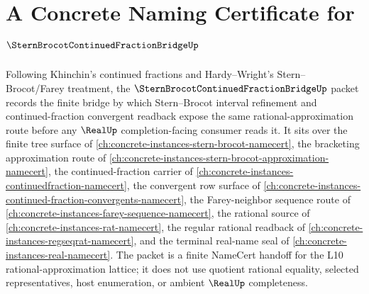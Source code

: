 \chapter{A Concrete Naming Certificate for $\SternBrocotContinuedFractionBridgeUp$}
\label{ch:concrete-instances-stern-brocot-continued-fraction-bridge-namecert}

Following Khinchin's continued fractions and Hardy--Wright's Stern--Brocot/Farey treatment, the $\SternBrocotContinuedFractionBridgeUp$ packet records the finite bridge by which Stern--Brocot interval refinement and continued-fraction convergent readback expose the same rational-approximation route before any $\RealUp$ completion-facing consumer reads it. It sits over the finite tree surface of \autoref{ch:concrete-instances-stern-brocot-namecert}, the bracketing approximation route of \autoref{ch:concrete-instances-stern-brocot-approximation-namecert}, the continued-fraction carrier of \autoref{ch:concrete-instances-continuedfraction-namecert}, the convergent row surface of \autoref{ch:concrete-instances-continued-fraction-convergents-namecert}, the Farey-neighbor sequence route of \autoref{ch:concrete-instances-farey-sequence-namecert}, the rational source of \autoref{ch:concrete-instances-rat-namecert}, the regular rational readback of \autoref{ch:concrete-instances-regseqrat-namecert}, and the terminal real-name seal of \autoref{ch:concrete-instances-real-namecert}. The packet is a finite NameCert handoff for the L10 rational-approximation lattice; it does not use quotient rational equality, selected representatives, host enumeration, or ambient $\RealUp$ completeness.

